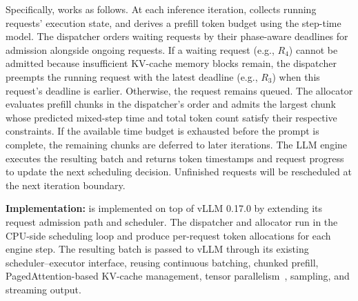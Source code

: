 Specifically, \tango{} works as follows.
 At each inference iteration, \tango{} collects running requests' execution state, and derives a prefill token budget using the step-time model.
 The dispatcher orders waiting requests by their phase-aware deadlines for admission alongside ongoing requests.
If a waiting request (e.g., $R_4$) cannot be admitted because insufficient KV-cache memory blocks remain, the dispatcher preempts the running request with the latest deadline (e.g., $R_3$) when this request's deadline is earlier. Otherwise, the request remains queued.
 The allocator evaluates prefill chunks in the dispatcher's order and admits the largest chunk whose predicted mixed-step time and total token count satisfy their respective constraints.
If the available time budget is exhausted before the prompt is complete, the remaining chunks are deferred to later iterations.
 The LLM engine executes the resulting batch and returns token timestamps and request progress to update the next scheduling decision.
Unfinished requests will be rescheduled at the next iteration boundary.

\textbf{Implementation:}
\tango{} is implemented on top of vLLM 0.17.0 by extending its request admission path and scheduler.
The dispatcher and allocator run in the CPU-side scheduling loop and produce per-request token allocations for each engine step.
The resulting batch is passed to vLLM through its existing scheduler--executor interface, reusing continuous batching, chunked prefill, PagedAttention-based KV-cache management, tensor parallelism~\cite{narayanan2021megatron,aminabadi2022deepspeed}, sampling, and streaming output.
